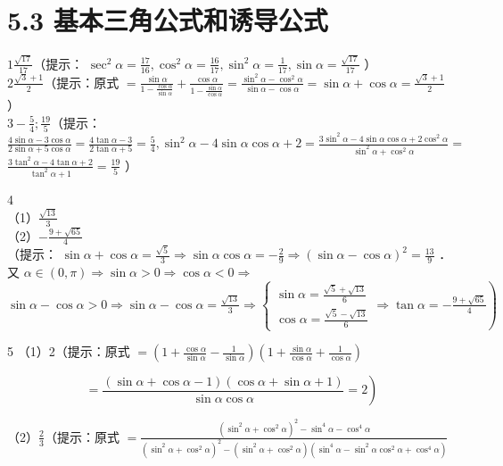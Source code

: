 \documentclass[10pt]{article}
\begin{document}
\section*{5.3 基本三角公式和诱导公式}
\(1 \frac{\sqrt{17}}{17}\)（提示： \(\sec ^{2} \alpha=\frac{17}{16}, \cos ^{2} \alpha=\frac{16}{17}, \sin ^{2} \alpha=\frac{1}{17}, \sin \alpha=\frac{\sqrt{17}}{17}\) ）\\
\(2 \frac{\sqrt{3}+1}{2}\)（提示：原式 \(=\frac{\sin \alpha}{1-\frac{\cos \alpha}{\sin \alpha}}+\frac{\cos \alpha}{1-\frac{\sin \alpha}{\cos \alpha}}=\frac{\sin ^{2} \alpha-\cos ^{2} \alpha}{\sin \alpha-\cos \alpha}=\sin \alpha+\cos \alpha=\frac{\sqrt{3}+1}{2}\) ）\\
\(3-\frac{5}{4} ; \frac{19}{5}\)（提示：\(\frac{4 \sin \alpha-3 \cos \alpha}{2 \sin \alpha+5 \cos \alpha}=\frac{4 \tan \alpha-3}{2 \tan \alpha+5}=\frac{5}{4}, \sin ^{2} \alpha-4 \sin \alpha \cos \alpha+2=\frac{3 \sin ^{2} \alpha-4 \sin \alpha \cos \alpha+2 \cos ^{2} \alpha}{\sin ^{2} \alpha+\cos ^{2} \alpha}=\) \(\frac{3 \tan ^{2} \alpha-4 \tan \alpha+2}{\tan ^{2} \alpha+1}=\frac{19}{5}\) ）

4\\
（1）\(\frac{\sqrt{13}}{3}\)\\
（2）\(-\frac{9+\sqrt{65}}{4}\)\\
（提示： \(\sin \alpha+\cos \alpha=\frac{\sqrt{5}}{3} \Rightarrow \sin \alpha \cos \alpha=-\frac{2}{9} \Rightarrow(\sin \alpha-\cos \alpha)^{2}=\frac{13}{9}\) ．又 \(\alpha \in(0, \pi) \Rightarrow \sin \alpha>0 \Rightarrow \cos \alpha<0 \Rightarrow\) \(\sin \alpha-\cos \alpha>0 \Rightarrow \sin \alpha-\cos \alpha=\frac{\sqrt{13}}{3} \Rightarrow\left\{\begin{array}{l}\sin \alpha=\frac{\sqrt{5}+\sqrt{13}}{6} \\ \cos \alpha=\frac{\sqrt{5}-\sqrt{13}}{6}\end{array} \Rightarrow \tan \alpha=-\frac{9+\sqrt{65}}{4}\right)\)

5 （1）2（提示：原式 \(=\left(1+\frac{\cos \alpha}{\sin \alpha}-\frac{1}{\sin \alpha}\right)\left(1+\frac{\sin \alpha}{\cos \alpha}+\frac{1}{\cos \alpha}\right)\)

\[
\left.=\frac{(\sin \alpha+\cos \alpha-1)(\cos \alpha+\sin \alpha+1)}{\sin \alpha \cos \alpha}=2\right)
\]

（2）\(\frac{2}{3}\)（提示：原式 \(=\frac{\left(\sin ^{2} \alpha+\cos ^{2} \alpha\right)^{2}-\sin ^{4} \alpha-\cos ^{4} \alpha}{\left(\sin ^{2} \alpha+\cos ^{2} \alpha\right)^{2}-\left(\sin ^{2} \alpha+\cos ^{2} \alpha\right)\left(\sin ^{4} \alpha-\sin ^{2} \alpha \cos ^{2} \alpha+\cos ^{4} \alpha\right)}\)
\end{document}
